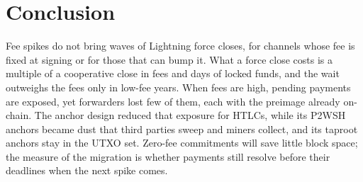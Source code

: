\section{Conclusion}
\label{sec:conclusion}
Fee spikes do not bring waves of Lightning force closes, for channels whose fee is fixed at signing or for those that
can bump it.
What a force close costs is a multiple of a cooperative close in fees and days of locked funds, and the wait outweighs
the fees only in low-fee years. When fees are high, pending payments are exposed, yet forwarders lost few of them, each
with the preimage already on-chain. The anchor design reduced that exposure for HTLCs, while its P2WSH anchors became
dust that third parties sweep and miners collect, and its taproot anchors stay in the UTXO set. Zero-fee commitments
will save little block space; the measure of the migration is whether payments still resolve before their deadlines
when the next spike comes.
